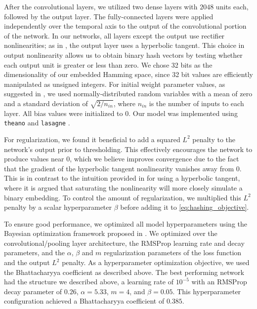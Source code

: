 After the convolutional layers, we utilized two dense layers with $2048$ units each, followed by the output layer.
The fully-connected layers were applied independently over the temporal axis to the output of the convolutional portion of the network.
In our networks, all layers except the output use rectifier nonlinearities; as in \cite{masci2014multimodal}, the output layer uses a hyperbolic tangent.
This choice in output nonlinearity allows us to obtain binary hash vectors by testing whether each output unit is greater or less than zero.
We chose 32 bits as the dimensionality of our embedded Hamming space, since 32 bit values are efficiently manipulated as unsigned integers.
For initial weight parameter values, as suggested in \cite{he2015delving}, we used normally-distributed random variables with a mean of zero and a standard deviation of $\sqrt{2/n_{in}}$, where $n_{in}$ is the number of inputs to each layer.
All bias values were initialized to $0$.
Our model was implemented using \texttt{theano} \cite{bastien2012theano,bergstra2010theano} and \texttt{lasagne} \cite{dieleman2015lasagne}.

For regularization, we found it beneficial to add a squared $L^2$ penalty to the network's output prior to thresholding.
This effectively encourages the network to produce values near 0, which we believe improves convergence due to the fact that the gradient of the hyperbolic tangent nonlinearity vanishes away from 0.
This is in contrast to the intuition provided in \cite{masci2014multimodal} for using a hyperbolic tangent, where it is argued that saturating the nonlinearity will more closely simulate a binary embedding.
To control the amount of regularization, we multiplied this $L^2$ penalty by a scalar hyperparameter $\beta$ before adding it to \cref{eq:hashing_objective}.

To ensure good performance, we optimized all model hyperparameters using the Bayesian optimization framework proposed in \cite{snoek2012practical}.
We optimized over the convolutional/pooling layer architecture, the RMSProp learning rate and decay parameters, and the $\alpha$, $\beta$ and $m$ regularization parameters of the loss function and the output $L^2$ penalty.
As a hyperparameter optimization objective, we used the Bhattacharyya coefficient as described above.
The best performing network had the structure we described above, a learning rate of $10^{-5}$ with an RMSProp decay parameter of $0.26$, $\alpha = 5.33$, $m = 4$, and $\beta = 0.05$.
This hyperparameter configuration achieved a Bhattacharyya coefficient of $0.385$.

